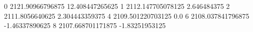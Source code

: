 0 2121.90966796875 12.408447265625
1 2112.147705078125 2.646484375
2 2111.8056640625 2.304443359375
4 2109.501220703125 0.0
6 2108.037841796875 -1.46337890625
8 2107.668701171875 -1.83251953125
